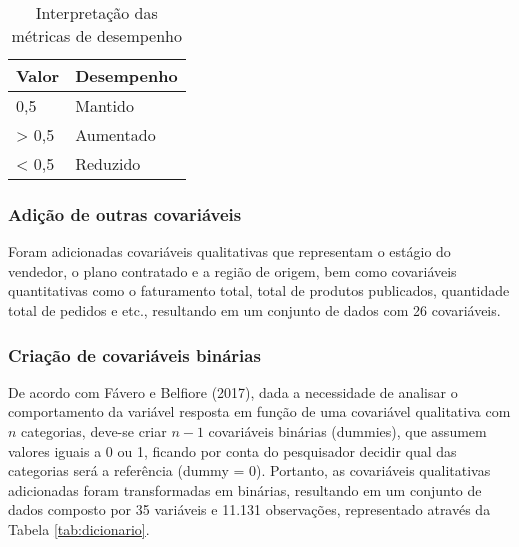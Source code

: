 \documentclass[twocolumn]{rbef}
\newcommand{\1}{\mathbbm{1}}
\begin{document}
\begin{table}

\caption{\label{tab:metricas}Interpretação das métricas de desempenho}
\centering
\fontsize{8}{10}\selectfont
\begin{tabular}[t]{ll}
\toprule
Valor & Desempenho\\
\midrule
0,5 & Mantido\\
> 0,5 & Aumentado\\
< 0,5 & Reduzido\\
\bottomrule
\end{tabular}
\end{table}

\hypertarget{adiuxe7uxe3o-de-outras-covariuxe1veis}{%
\subsubsection{Adição de outras covariáveis}\label{adiuxe7uxe3o-de-outras-covariuxe1veis}}

Foram adicionadas covariáveis qualitativas que representam o estágio do vendedor, o plano contratado e a região de origem, bem como covariáveis quantitativas como o faturamento total, total de produtos publicados, quantidade total de pedidos e etc., resultando em um conjunto de dados com 26 covariáveis.

\hypertarget{criauxe7uxe3o-de-covariuxe1veis-binuxe1rias}{%
\subsubsection{Criação de covariáveis binárias}\label{criauxe7uxe3o-de-covariuxe1veis-binuxe1rias}}

De acordo com Fávero e Belfiore (2017), dada a necessidade de analisar o comportamento da variável resposta em função de uma covariável qualitativa com \(n\) categorias, deve-se criar \(n-1\) covariáveis binárias (dummies), que assumem valores iguais a 0 ou 1, ficando por conta do pesquisador decidir qual das categorias será a referência (dummy = 0). Portanto, as covariáveis qualitativas adicionadas foram transformadas em binárias, resultando em um conjunto de dados composto por 35 variáveis e 11.131 observações, representado através da Tabela \ref{tab:dicionario}.
\end{document}
